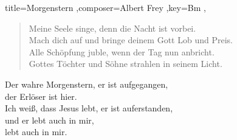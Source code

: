 \documentclass[]{leadsheet}
\begin{document}
\begin{song}{title={Morgenstern
},composer={Albert Frey
},key={Bm
},}
\begin{verse}
Meine Seele singe, denn die Nacht ist vorbei. \\
Mach dich auf und bringe deinem Gott Lob und Preis. \\
Alle Schöpfung juble, wenn der Tag nun anbricht. \\
Gottes Töchter und Söhne strahlen in seinem Licht. \\
\end{verse}

\begin{chorus}
Der wahre Morgenstern, er ist aufgegangen, \\
der Erlöser ist hier. \\
Ich weiß, dass Jesus lebt, er ist auferstanden, \\
und er lebt auch in mir, \\
lebt auch in mir. \\
\end{chorus}

\end{song}
\end{document}

